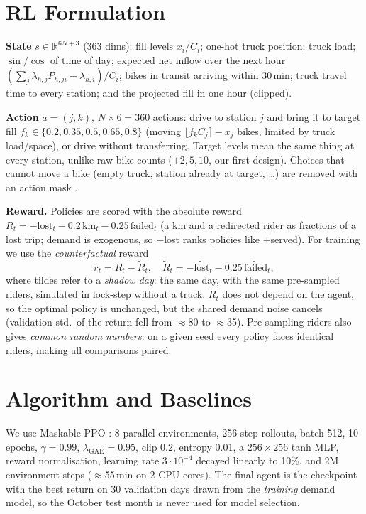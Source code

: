 \documentclass[10pt,twocolumn]{article}
\begin{document}
\section{RL Formulation}
\textbf{State} $s\in\mathbb{R}^{6N+3}$ ($363$ dims): fill levels $x_i/C_i$;
one-hot truck position; truck load; $\sin/\cos$ of time of day; expected net
inflow over the next hour $(\sum_j\lambda_{h,j}P_{h,ji}-\lambda_{h,i})/C_i$;
bikes in transit arriving within 30\,min; truck travel time to every station;
and the projected fill in one hour (clipped).

\textbf{Action} $a=(j,k)$, $N{\times}6=360$ actions: drive to station $j$ and
bring it to target fill $f_k\in\{0.2,0.35,0.5,0.65,0.8\}$ (moving
$\lfloor f_kC_j\rceil-x_j$ bikes, limited by truck load/space), or drive without
transferring. Target levels mean the same thing at every station, unlike raw
bike counts ($\pm2,5,10$, our first design). Choices that cannot move a bike
(empty truck, station already at target, \dots) are removed with an action
mask \cite{huang2020mask}.

\textbf{Reward.} Policies are scored with the absolute reward
$R_t = -\text{lost}_t - 0.2\,\text{km}_t - 0.25\,\text{failed}_t$ (a km and a
redirected rider as fractions of a lost trip; demand is exogenous, so $-$lost
ranks policies like $+$served). For training we use the \emph{counterfactual}
reward
\begin{equation*}
r_t = R_t - \tilde R_t,\quad \tilde R_t = -\widetilde{\text{lost}}_t - 0.25\,\widetilde{\text{failed}}_t ,
\end{equation*}
where tildes refer to a \emph{shadow day}: the same day, with the same
pre-sampled riders, simulated in lock-step without a truck. $\tilde R_t$ does
not depend on the agent, so the optimal policy is unchanged, but the shared
demand noise cancels (validation std.\ of the return fell from $\approx$80 to
$\approx$35). Pre-sampling riders also gives \emph{common random numbers}: on a
given seed every policy faces identical riders, making all comparisons paired.

\section{Algorithm and Baselines}
We use Maskable PPO \cite{schulman2017ppo,raffin2021sb3}: 8 parallel
environments, 256-step rollouts, batch 512, 10 epochs, $\gamma{=}0.99$,
$\lambda_{\text{GAE}}{=}0.95$, clip 0.2, entropy 0.01, a $256{\times}256$ tanh MLP,
reward normalisation, learning rate $3{\cdot}10^{-4}$ decayed linearly to 10\%,
and 2M environment steps ($\approx$55\,min on 2 CPU cores). The final agent is
the checkpoint with the best return on 30 validation days drawn from the
\emph{training} demand model, so the October test month is never used for model
selection.
\end{document}
